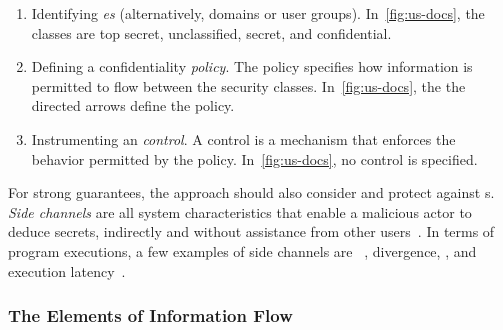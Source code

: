 \begin{enumerate} 

\item Identifying \emph{es} (alternatively, domains or user groups).
In~\autoref{fig:us-docs}, the classes are top secret, unclassified, secret, and confidential.

\item Defining a confidentiality \emph{policy}.
The policy specifies how information is permitted to flow between the security classes.
In~\autoref{fig:us-docs}, the the directed arrows define the policy.

\item Instrumenting an \emph{control}. 
A control is a mechanism that enforces the behavior permitted by the policy.
In~\autoref{fig:us-docs}, no control is specified.

\end{enumerate}

For strong  guarantees, the  approach
should also consider and protect against s. \emph{Side
channels} are all system characteristics that enable a malicious actor to deduce
secrets, indirectly and without assistance from other users~\cite[p.
280]{bishop2003}. In terms of program executions, a few examples of side
channels are ~\cite{stefan2012}, divergence, ,
and execution latency~\cite{lawson2009}.
 
\subsubsection{The Elements of Information Flow}
\label{if-elements}

